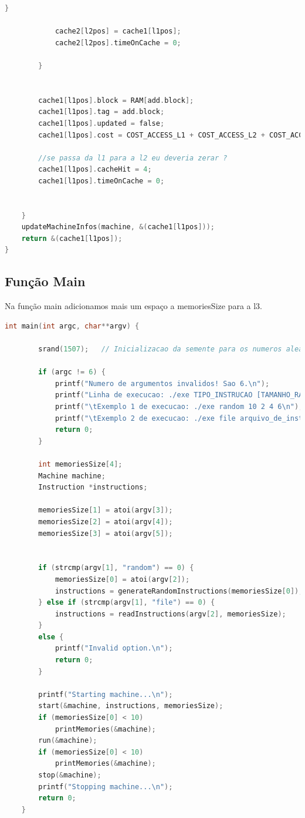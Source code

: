 \documentclass{article}
\begin{document}
\begin{lstlisting}[caption={Função MMUSearchOnMemorys},label={lst:cod6},language=C]
            }

            cache2[l2pos] = cache1[l1pos];
            cache2[l2pos].timeOnCache = 0;

        }

        
        cache1[l1pos].block = RAM[add.block];
        cache1[l1pos].tag = add.block;
        cache1[l1pos].updated = false;
        cache1[l1pos].cost = COST_ACCESS_L1 + COST_ACCESS_L2 + COST_ACCESS_L3 + COST_ACCESS_RAM;

        //se passa da l1 para a l2 eu deveria zerar ?
        cache1[l1pos].cacheHit = 4;
        cache1[l1pos].timeOnCache = 0;


    }
    updateMachineInfos(machine, &(cache1[l1pos]));
    return &(cache1[l1pos]);
}

\end{lstlisting}

\clearpage

\subsection{Função Main}

Na função main adicionamos mais um espaço a memoriesSize para a l3.

\begin{lstlisting}[caption={Main},label={lst:cod6},language=C]
    int main(int argc, char**argv) {

        srand(1507);   // Inicializacao da semente para os numeros aleatorios.

        if (argc != 6) {
            printf("Numero de argumentos invalidos! Sao 6.\n");
            printf("Linha de execucao: ./exe TIPO_INSTRUCAO [TAMANHO_RAM|ARQUIVO_DE_INSTRUCOES] TAMANHO_L1 TAMANHO_L2 TAMANHO_L3\n");
            printf("\tExemplo 1 de execucao: ./exe random 10 2 4 6\n");
            printf("\tExemplo 2 de execucao: ./exe file arquivo_de_instrucoes.txt\n");
            return 0;
        }

        int memoriesSize[4];
        Machine machine;
        Instruction *instructions;

        memoriesSize[1] = atoi(argv[3]);
        memoriesSize[2] = atoi(argv[4]);
        memoriesSize[3] = atoi(argv[5]);


        if (strcmp(argv[1], "random") == 0) {
            memoriesSize[0] = atoi(argv[2]);
            instructions = generateRandomInstructions(memoriesSize[0]);
        } else if (strcmp(argv[1], "file") == 0) {
            instructions = readInstructions(argv[2], memoriesSize);
        } 
        else {
            printf("Invalid option.\n");
            return 0;
        }
        
        printf("Starting machine...\n");
        start(&machine, instructions, memoriesSize);
        if (memoriesSize[0] < 10)
            printMemories(&machine);
        run(&machine);
        if (memoriesSize[0] < 10)
            printMemories(&machine);
        stop(&machine);
        printf("Stopping machine...\n");
        return 0;
    }
\end{lstlisting}
\clearpage
\end{document}
